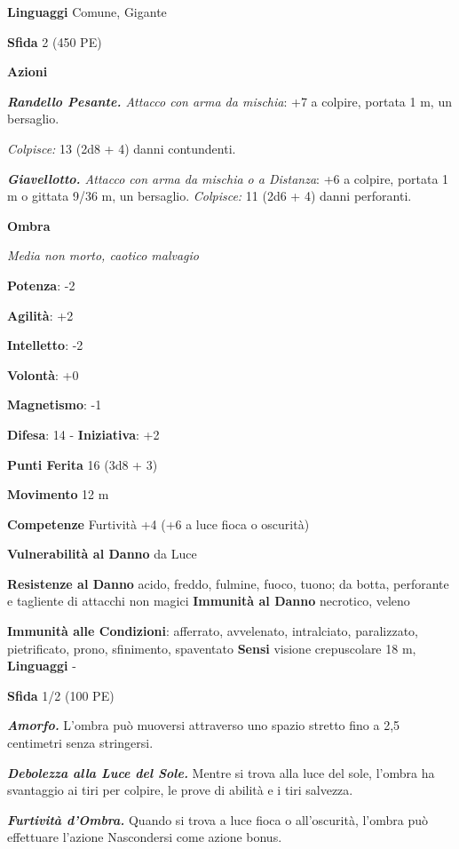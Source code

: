 \begin{multicols}{2}
\textbf{Linguaggi} Comune, Gigante

\textbf{Sfida} 2 (450 PE)\smallskip

\smallskip\textbf{Azioni}

\emph{\textbf{Randello Pesante.} Attacco con arma da mischia}: +7 a
colpire, portata 1 m, un bersaglio.

\emph{Colpisce:} 13 (2d8 + 4) danni contundenti.

\emph{\textbf{Giavellotto.} Attacco con arma da mischia o a Distanza}:
+6 a colpire, portata 1 m o gittata 9/36 m, un bersaglio.
\emph{Colpisce:} 11 (2d6 + 4) danni perforanti.

\textbf{Ombra}

\emph{Media non morto, caotico malvagio}

\textbf{Potenza}: -2

\textbf{Agilità}: +2

\textbf{Intelletto}: -2

\textbf{Volontà}: +0

\textbf{Magnetismo}: -1

\textbf{Difesa}: 14 - \textbf{Iniziativa}: +2

\textbf{Punti Ferita} 16 (3d8 + 3)

\textbf{Movimento} 12 m

\textbf{Competenze} Furtività +4 (+6 a luce fioca o oscurità)

\textbf{Vulnerabilità al Danno} da Luce

\textbf{Resistenze al Danno} acido, freddo, fulmine, fuoco, tuono;
da botta, perforante e tagliente di attacchi non magici
\textbf{Immunità al Danno} necrotico, veleno

\textbf{Immunità alle Condizioni}: afferrato, avvelenato, intralciato,
paralizzato, pietrificato, prono, sfinimento, spaventato \textbf{Sensi}
visione crepuscolare 18 m,  \textbf{Linguaggi} -

\textbf{Sfida} 1/2 (100 PE)\smallskip

\emph{\textbf{Amorfo.}} L'ombra può muoversi attraverso uno spazio
stretto fino a 2,5 centimetri senza stringersi.

\emph{\textbf{Debolezza alla Luce del Sole.}} Mentre si trova alla luce
del sole, l'ombra ha svantaggio ai tiri per colpire, le prove di abilità
e i tiri salvezza.

\emph{\textbf{Furtività d'Ombra.}} Quando si trova a luce fioca o
all'oscurità, l'ombra può effettuare l'azione Nascondersi come azione
bonus.


\end{multicols}
